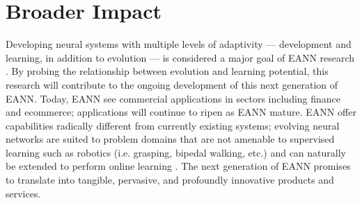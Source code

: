 \section{Broader Impact}

Developing neural systems with multiple levels of adaptivity --- development and learning, in addition to evolution --- is considered a major goal of EANN research \autocite{Downing2015IntelligenceSystems}. By probing the relationship between evolution and learning potential, this research will contribute to the ongoing development of this next generation of EANN. Today, EANN see commercial applications in sectors including finance and ecommerce; applications will continue to ripen as EANN mature. EANN offer capabilities radically different from currently existing systems; evolving neural networks are suited to problem domains that are not amenable to supervised learning such as robotics (i.e. grasping, bipedal walking, etc.) \autocite{Downing2015IntelligenceSystems} and can naturally be extended to perform online learning \autocite{Tonelli2013OnNetworks}. The next generation of EANN promises to translate into tangible, pervasive, and profoundly innovative products and services.




